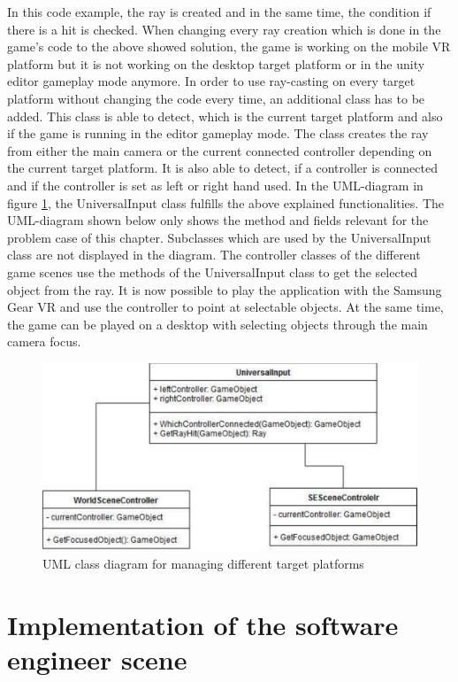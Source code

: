 In this code example, the ray is created and in the same time, the condition if there is a hit is checked.
When changing every ray creation which is done in the game's code to the above showed solution, the game is working on the mobile VR platform but it is not working on the desktop target platform or in the unity editor gameplay mode anymore. In order to use ray-casting on every target platform without changing the code every time, an additional class has to be added. This class is able to detect, which is the current target platform and also if the game is running in the editor gameplay mode. The class creates the ray from either the main camera or the current connected controller depending on the current target platform. It is also able to detect, if a controller is connected and if the controller is set as left or right hand used. In the UML-diagram in figure \ref{fig:uml-universalinput}, the UniversalInput class fulfills the above explained functionalities. The UML-diagram shown below only shows the method and fields relevant for the problem case of this chapter. Subclasses which are used by the UniversalInput class are not displayed in the diagram. The controller classes of the different game scenes use the methods of the UniversalInput class to get the selected object from the ray. It is now possible to play the application with the Samsung Gear VR and use the controller to point at selectable objects. At the same time, the game can be played on a desktop with selecting objects through the main camera focus.
\begin{figure}[h!]
  \includegraphics[width=13cm]{kapitel/eps/uml-input.pdf}
  \centering
  \caption{UML class diagram for managing different target platforms}
  \label{fig:uml-universalinput}
\end{figure}
\section{Implementation of the software engineer scene}
